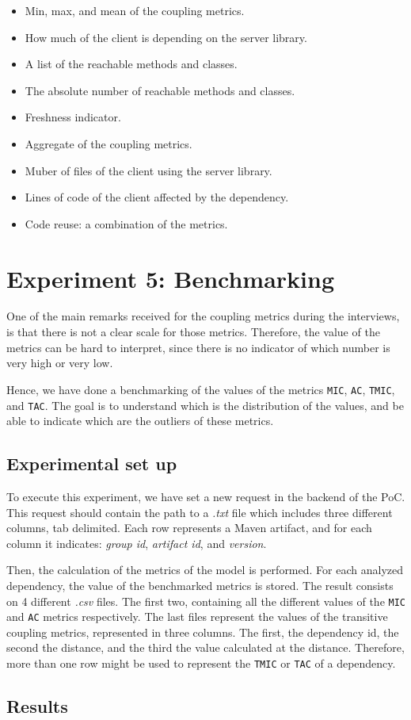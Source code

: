 \begin{itemize}
  \item Min, max, and mean of the coupling metrics.
  \item How much of the client is depending on the server library.
  \item A list of the reachable methods and classes.
  \item The absolute number of reachable methods and classes.
  \item Freshness indicator.
  \item Aggregate of the coupling metrics.
  \item Muber of files of the client using the server library.
  \item Lines of code of the client affected by the dependency.
  \item Code reuse: a combination of the metrics.
\end{itemize}

\section{Experiment 5: Benchmarking}
One of the main remarks received for the coupling metrics during the interviews, is that there is not a clear scale for those metrics. Therefore, the value of the metrics can be hard to interpret, since there is no indicator of which number is very high or very low.

Hence, we have done a benchmarking of the values of the metrics \texttt{MIC}, \texttt{AC}, \texttt{TMIC}, and \texttt{TAC}. The goal is to understand which is the distribution of the values, and be able to indicate which are the outliers of these metrics.

\subsection{Experimental set up}
To execute this experiment, we have set a new request in the backend of the PoC. This request should contain the path to a \textit{.txt} file which includes three different columns, tab delimited. Each row represents a Maven artifact, and for each column it indicates: \textit{group id}, \textit{artifact id}, and \textit{version}.

Then, the calculation of the metrics of the model is performed. For each analyzed dependency, the value of the benchmarked metrics is stored. The result consists on 4 different \textit{.csv} files. The first two, containing all the different values of the \texttt{MIC} and \texttt{AC} metrics respectively. The last files represent the values of the transitive coupling metrics, represented in three columns. The first, the dependency id, the second the distance, and the third the value calculated at the distance. Therefore, more than one row might be used to represent the \texttt{TMIC} or \texttt{TAC} of a dependency.

\subsection{Results}
